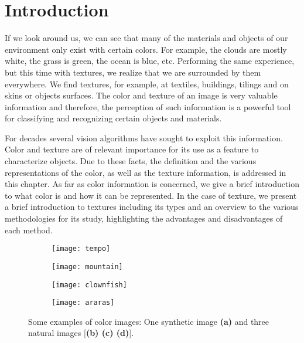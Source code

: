 \section{Introduction}

If we look around us, we can see that many of the materials and objects of our environment only exist with certain colors. For example, the clouds are mostly  white, the grass is green, the ocean is blue, etc. Performing the same experience, but this time with textures, we realize that we are surrounded by them everywhere. We find textures, for example, at textiles, buildings, tilings and on skins or objects surfaces. The color and texture of an image is very valuable information and therefore, the perception of such information is a powerful tool for classifying and recognizing certain objects and materials.

For decades several vision algorithms have sought to exploit this information. Color and texture are of relevant importance for its use as a feature to characterize objects. Due to these facts, the definition and the various representations of the color, as well as the texture information, is addressed in this chapter. As far as color information is concerned, we give a brief introduction to what color is and how it can be represented. In the case of texture, we present a brief introduction to textures including its types and an overview to the various methodologies for its study, highlighting the advantages and disadvantages of each method. 


\begin{figure}[!ht]
    \centering
    \begin{subfigure}[b]{0.24\textwidth}
        \texttt{[image: tempo]}
        \caption{}
        \label{fig:tempo}
    \end{subfigure}
    \begin{subfigure}[b]{0.24\textwidth}
        \texttt{[image: mountain]}
        \caption{}
        \label{fig:parrots}
    \end{subfigure} 
    \begin{subfigure}[b]{0.24\textwidth}
        \texttt{[image: clownfish]}
        \caption{}
        \label{fig:clownfish}
    \end{subfigure}
    \begin{subfigure}[b]{0.24\textwidth}
        \texttt{[image: araras]}
        \caption{}
        \label{fig:mountains}
    \end{subfigure}
                  
    \caption{Some examples of color images: One synthetic image {\small \textsf{\textbf{(a)}}} and three natural images [{\small \textsf{\textbf{(b) (c) (d)}}}].}\label{fig:color_images}    
\end{figure}


